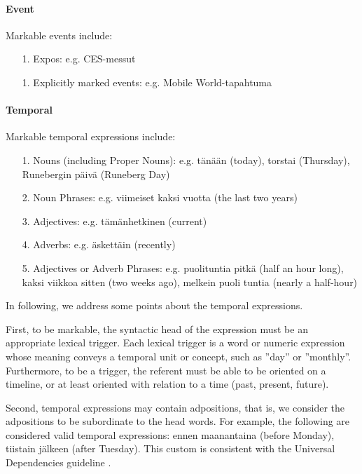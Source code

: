 \documentclass[11pt]{article}
\begin{document}
\paragraph{Event}

Markable events include:

\begin{itemize}

\item[1.] Expos: e.g. CES-messut
\item[1.] Explicitly marked events: e.g. Mobile World-tapahtuma

\end{itemize}



\paragraph{Temporal} Markable temporal expressions include:

\begin{itemize}

\item[1.] Nouns (including Proper Nouns): e.g. t\"an\"a\"an (today), torstai (Thursday), Runebergin p\"aiv\"a (Runeberg Day)
\item[2.] Noun Phrases: e.g. viimeiset kaksi vuotta (the last two years)
\item[3.] Adjectives: e.g. t\"am\"anhetkinen (current)
\item[4.] Adverbs: e.g. \"askett\"ain (recently)
\item[5.] Adjectives or Adverb Phrases: e.g. puolituntia pitk\"a (half an hour long), kaksi viikkoa sitten (two weeks ago), melkein puoli tuntia (nearly a half-hour)

\end{itemize}

In following, we address some points about the temporal expressions.

First, to be markable, the syntactic head of the expression must be an appropriate lexical trigger. Each lexical trigger is a word or numeric expression whose meaning conveys a temporal unit or concept, such as ''day'' or ''monthly''. Furthermore, to be a trigger, the referent must be able to be oriented on a timeline, or at least oriented with relation to a time (past, present, future).

Second, temporal expressions may contain adpositions, that is, we consider the adpositions to be subordinate to the head words. For example, the following are considered valid temporal expressions: ennen maanantaina (before Monday), tiistain j\"alkeen (after Tuesday). This custom is consistent with the Universal Dependencies guideline \cite{}. 
\end{document}
